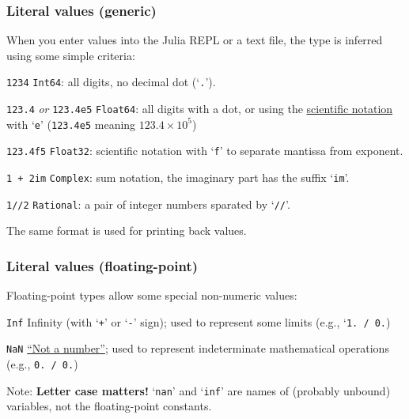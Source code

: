 \documentclass[english,serif,mathserif,xcolor=pdftex,dvipsnames,table]{beamer}
\begin{document}
\begin{frame}
  \frametitle{Literal values (generic)}
  \smaller

  When you enter values into the Julia REPL or a text file, the type
  is inferred using some simple criteria:

  \+
  \begin{describe}{\texttt{1234}}
    \texttt{Int64}: all digits, no decimal dot (`\texttt{.}').
  \end{describe}

  \begin{describe}{\texttt{123.4} \emph{or} \texttt{123.4e5}}
    \texttt{Float64}: all digits with a dot, or using the \href{https://en.wikipedia.org/wiki/Scientific_notation}{scientific notation} with `\texttt{e}' (\texttt{123.4e5} meaning $123.4 \times 10^5$)
  \end{describe}

  \begin{describe}{\texttt{123.4f5}}
    \texttt{Float32}: scientific notation with `\texttt{f}' to separate mantissa from exponent.
  \end{describe}

  \begin{describe}{\texttt{1 + 2im}}
    \texttt{Complex}: sum notation, the imaginary part has the suffix `\texttt{im}'.
  \end{describe}

  \begin{describe}{\texttt{1//2}}
    \texttt{Rational}: a pair of integer numbers sparated by `\texttt{//}'.
  \end{describe}

  \+
  The same format is used for printing back values.
\end{frame}


\begin{frame}[fragile]
  \frametitle{Literal values (floating-point)}
  Floating-point types allow some special non-numeric values:

  \begin{describe}{\texttt{Inf}}
    Infinity (with `\texttt{+}' or `\texttt{-}' sign); used to
    represent some limits (e.g., `\texttt{1. / 0.})
  \end{describe}

  \begin{describe}{\texttt{NaN}}
    \href{https://en.wikipedia.org/wiki/NaN#Floating_point}{``Not a
      number''}; used to represent indeterminate mathematical
    operations (e.g., \texttt{0. / 0.})
  \end{describe}

  \+ Note: \textbf{Letter case matters!} `\texttt{nan}' and
  `\texttt{inf}' are names of (probably unbound) variables, not the
  floating-point constants.
\end{frame}
\end{document}
